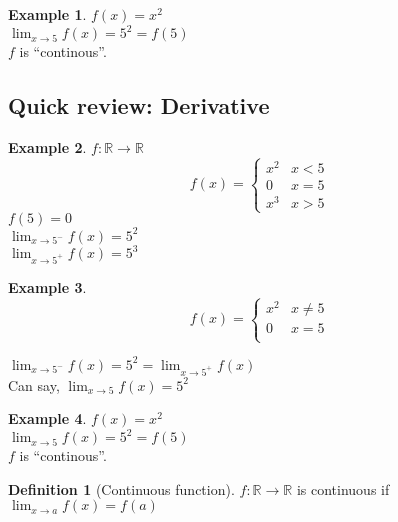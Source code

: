 \documentclass[twocolumn,20pt,fleqn]{extarticle}
\theoremstyle{plain}
\theoremstyle{definition}
\newtheorem*{definition}{Definition}
\newtheorem*{example}{Example}
\theoremstyle{remark}
\begin{document}
\newpage
\begin{example}
$f(x) = x^2$\\
$\displaystyle\lim_{x \to 5} f(x) = 5^2 = f(5)$\\
$f$ is ``continous''.
\end{example}




\clearpage



\subsection{Quick review: Derivative}
\begin{example}
  $f : \mathbb{R}\to \mathbb{R}$
  \[f(x) =
      \begin{cases}
        x^2 & x < 5\\
        0 & x = 5\\
        x^3 & x > 5
      \end{cases}
      \]
      $f(5)=0$\\
$\displaystyle\lim_{x \to 5^-} f(x)  = 5^2$\\
$\displaystyle\lim_{x \to 5^+} f(x)  = 5^3$
\end{example}


\begin{example}
  \[f(x) =
      \begin{cases}
        x^2 & x  \neq  5\\
        0 & x = 5\\
        
      \end{cases}
      \]
      
      


$\displaystyle\lim_{x \to 5^-} f(x) = 5^2  = \displaystyle\lim_{x \to 5^+} f(x)$\\
Can say, $\displaystyle\lim_{x \to 5} f(x) = 5^2$
\end{example}

\newpage
\begin{example}
$f(x) = x^2$\\
$\displaystyle\lim_{x \to 5} f(x) = 5^2 = f(5)$\\
$f$ is ``continous''.
\end{example}

\begin{definition}[Continuous function]
$f : \mathbb{R} \to \mathbb{R}$ is continuous if $\displaystyle\lim_{x \to a} f(x) = f(a)$
\end{definition}
\end{document}
